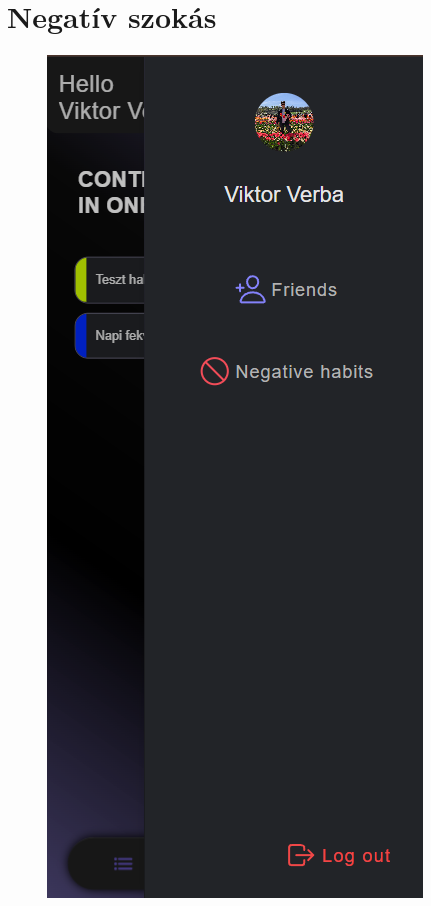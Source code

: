 \documentclass[12pt]{report}
\begin{document}
\section{Negatív szokás}
\begin{figure}[H]
    \centering
    \begin{minipage}[b]{0.2\textwidth}
        \centering
        \includegraphics[width=\linewidth]{src/Oldaltmenu.png}

\end{minipage}
\end{figure}
\end{document}
